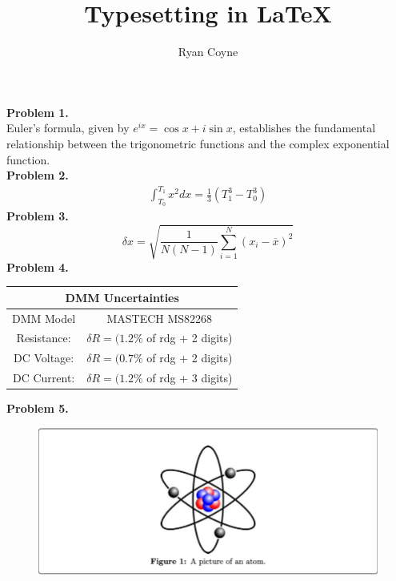 \documentclass[12pt]{article}
\begin{document}
    \title{Typesetting in \LaTeX}
    \author{Ryan Coyne}
    \date{}
    \maketitle
    \noindent\textbf{Problem 1.}\\
    Euler's formula, given by \(e^{ix}=\cos x + i\sin x\), establishes the fundamental relationship between the trigonometric functions and the complex exponential function.\\
    \textbf{Problem 2.}
    \begin{align*}
        \int_{T_0}^{T_1} x^2 dx = \frac{1}{3}(T_1^3-T_0^3)
    \end{align*}
    \textbf{Problem 3.}
    \begin{equation}
        \delta x=\sqrt{\frac{1}{N(N-1)}\sum_{i=1}^N(x_i-\overline{x})^2}
    \end{equation}
    \textbf{Problem 4.}
    \begin{table}[H]
        \centering
        \begin{tabular}{|c|c|}
            \hline
            \multicolumn{2}{|c|}{DMM Uncertainties}\\
            \hline
            DMM Model & MASTECH MS82268\\
            \hline
            Resistance: &\(\delta R=(1.2\%\) of rdg + 2 digits)\\
            \hline
            DC Voltage: & \(\delta R= (0.7\% \) of rdg + 2 digits)\\
            \hline
            DC Current: & \(\delta R= (1.2\% \) of rdg + 3 digits)\\
            \hline
        \end{tabular}
    \end{table}
    \noindent\textbf{Problem 5.}
    \begin{figure}[H]
        \centering
        \includegraphics[width=0.8\linewidth]{atom.png}
    \end{figure}
\end{document}
